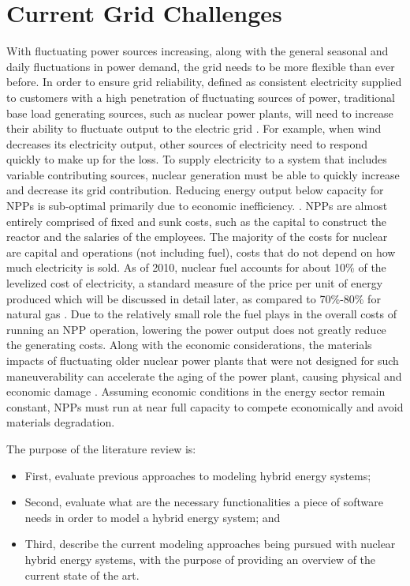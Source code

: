 \documentclass[12pt]{UIdahoMastersThesis}
\begin{document}
\section{Current Grid Challenges}
With fluctuating power sources increasing, along with the general seasonal and daily fluctuations in power demand, the grid needs to be more flexible than ever before. In order to ensure grid reliability, defined as consistent electricity supplied to customers with a high penetration of fluctuating sources of power, traditional base load generating sources, such as nuclear power plants, will need to increase their ability to fluctuate output to the electric grid \cite {Denholm2011}. For example, when wind decreases its electricity output, other sources of electricity need to respond quickly to make up for the loss. To supply electricity to a system that includes variable contributing sources, nuclear generation must be able to quickly increase and decrease its grid contribution.
Reducing energy output below capacity for NPPs is sub-optimal primarily due to economic inefficiency.  \cite{Nuclear2011}. NPPs are almost entirely comprised of fixed and sunk costs, such as the capital to construct the reactor and the salaries of the employees. The majority of the costs for nuclear are capital and operations (not including fuel), costs that do not depend on how much electricity is sold. As of 2010, nuclear fuel accounts for about 10\% of the levelized cost of electricity, a standard measure of the price per unit of energy produced which will be discussed in detail later, as compared to 70\%-80\% for natural gas \cite{IEA/NEA}. Due to the relatively small role the fuel plays in the overall costs of running an NPP operation, lowering the power output does not greatly reduce the generating costs. Along with the economic considerations, the materials impacts  of fluctuating older nuclear power plants that were not designed for such maneuverability can accelerate the aging of the power plant, causing physical and economic damage \cite{Nuclear2011}. Assuming economic conditions in the energy sector remain constant, NPPs must run at near full capacity to compete economically and avoid materials degradation.

The purpose of the literature review is:
\begin{itemize}
\item First, evaluate previous approaches to modeling hybrid energy systems;
\item Second, evaluate what are the necessary functionalities a piece of software needs in order to model a hybrid energy system; and
\item Third, describe the current modeling approaches being pursued with nuclear hybrid energy systems, with the purpose of providing an overview of the current state of the art.
\end{itemize}
\end{document}
